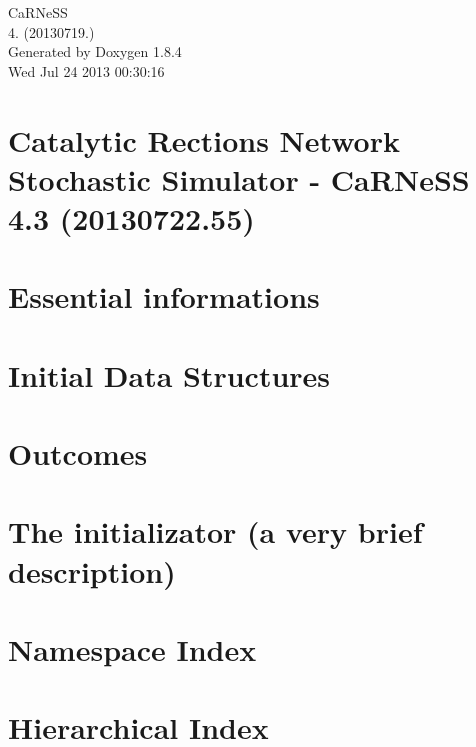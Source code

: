 \documentclass[twoside]{book}
\newcommand{\clearemptydoublepage}{%
  \newpage{\pagestyle{empty}\cleardoublepage}%
}
\begin{document}
\hypersetup{pageanchor=false}
\begin{titlepage}
\vspace*{7cm}
\begin{center}%
{\Large Ca\-R\-Ne\-S\-S \\[1ex]\large 4. (20130719.) }\\
\vspace*{1cm}
{\large Generated by Doxygen 1.8.4}\\
\vspace*{0.5cm}
{\small Wed Jul 24 2013 00:30:16}\\
\end{center}
\end{titlepage}
\clearemptydoublepage
\tableofcontents
\clearemptydoublepage
{}
\hypersetup{pageanchor=true}

\chapter{Catalytic Rections Network Stochastic Simulator -\/ Ca\-R\-Ne\-S\-S 4.3 (20130722.55)}
\label{index}\hypertarget{index}{}
\chapter{Essential informations}
\label{intro}
\hypertarget{intro}{}

\chapter{Initial Data Structures}
\label{pageInitStr}
\hypertarget{pageInitStr}{}

\chapter{Outcomes}
\label{pageoutcomes}
\hypertarget{pageoutcomes}{}

\chapter{The initializator (a very brief description)}
\label{pageInitializator}
\hypertarget{pageInitializator}{}

\chapter{Namespace Index}

\chapter{Hierarchical Index}

\end{document}
